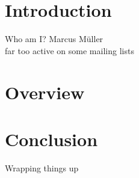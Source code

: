 %
\section{Introduction}

\begin{frame}{Who am I?}
  Marcus Müller\\
  far too active on some mailing lists
\end{frame}

\section*{Overview}

\begin{frame}
  \tableofcontents

\end{frame}


\section{Conclusion}

\begin{frame}{Wrapping things up}
\end{frame}